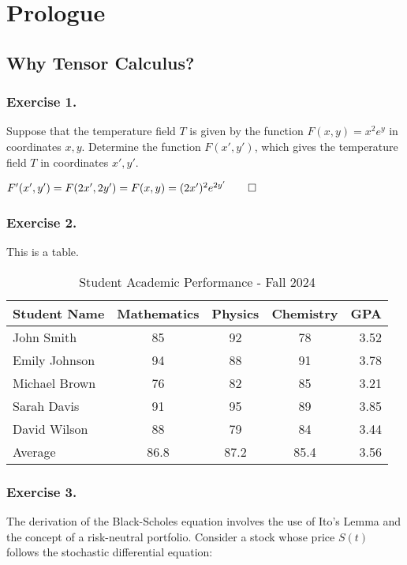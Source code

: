 \documentclass[../main.tex]{subfiles}
\begin{document}
\vfill
\chapter{Prologue}

\vfill
\newpage
\section{Why Tensor Calculus?}
\subsection{Exercise 1.}
Suppose that the temperature field $T$ is given by the function $F(x,y)=x^2e^y$ in coordinates $x, y$. Determine the function $F(x',y')$, which gives the temperature field $T$ in coordinates $x',y'$.

\sol

$F'(x',y')=F(2x',2y')=F(x,y)=(2x')^2e^{2y'}\qed$

\subsection{Exercise 2.}

This is a table.

\begin{table}[h]
    \centering
    \caption{Student Academic Performance - Fall 2024}
    \label{tab:student_performance}
    \begin{tabular}{@{}lcccr@{}}
        \toprule
        Student Name & Mathematics & Physics & Chemistry & GPA \\
        \midrule
        John Smith & 85 & 92 & 78 & 3.52 \\
        Emily Johnson & 94 & 88 & 91 & 3.78 \\
        Michael Brown & 76 & 82 & 85 & 3.21 \\
        Sarah Davis & 91 & 95 & 89 & 3.85 \\
        David Wilson & 88 & 79 & 84 & 3.44 \\
        \midrule
        Average & 86.8 & 87.2 & 85.4 & 3.56 \\
        \bottomrule
    \end{tabular}
\end{table}

\subsection{Exercise 3.}
The derivation of the Black-Scholes equation involves the use of Ito's Lemma and the concept of a risk-neutral portfolio. Consider a stock whose price \( S(t) \) follows the stochastic differential equation:
\end{document}
